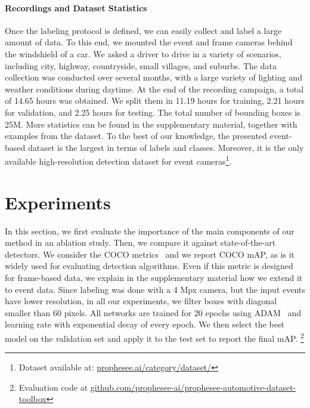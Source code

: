 \documentclass{article}
\begin{document}
\paragraph{Recordings and Dataset Statistics}
Once the labeling protocol is defined, we can easily collect and label a large amount of data.
To this end, we mounted the event and frame cameras behind 
the windshield of a car. We asked a driver to drive in a variety of scenarios, including city,
highway, countryside, small villages, and suburbs. 
The data collection was conducted over several months, 
with a large variety of lighting and weather conditions during daytime.
At the end of the recording campaign, a total of 14.65 hours was obtained. 
We split them in 11.19 hours for training, 2.21 hours for validation, and 2.25 hours for testing.
The total number of bounding boxes is 25M.
More statistics can be found in the supplementary material, together with examples from the dataset.
To the best of our knowledge, the presented event-based dataset is the largest in terms of labels and classes.
Moreover, it is the only available high-resolution detection dataset for event cameras\footnote{Dataset available at: \href{https://www.prophesee.ai/category/dataset/}{prophesee.ai/category/dataset/}}.














 
\vspace{-3mm}
\section{Experiments}
\label{sec:experiments}
\vspace{-2mm}
In this section, we first evaluate the importance of the main components of our method in an ablation study. Then, we compare it against state-of-the-art detectors.
We consider the COCO metrics~\cite{lin2014microsoft}
and we report COCO mAP, as is it widely used for evaluating detection algorithms. Even if this metric is designed for frame-based data, we explain in the supplementary material how we extend it to event data.
Since labeling was done with a 4 Mpx camera, but the input events have lower resolution, in all our experiments, 
we filter boxes with diagonal smaller than 60 pixels. 
All networks are trained for 20 epochs using ADAM~\cite{kingma2014adam} and learning rate  with exponential decay of  every epoch. 
We then select the best model on the validation set and apply it to the test set to report the final mAP.
\footnote{Evaluation code at \href{https://github.com/prophesee-ai/prophesee-automotive-dataset-toolbox}{github.com/prophesee-ai/prophesee-automotive-dataset-toolbox}
}
\vspace{-2mm}
\end{document}

